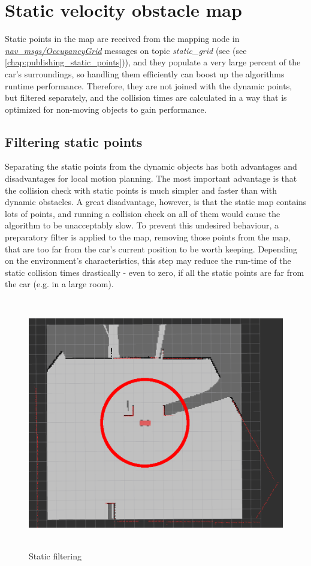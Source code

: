 \section{Static velocity obstacle map}
\label{chap:static_velocity_obstacle_map}
Static points in the map are received from the mapping node in \href{http://docs.ros.org/melodic/api/nav_msgs/html/msg/OccupancyGrid.html}{\textit{nav\_msgs/OccupancyGrid}} messages on topic \textit{static\_grid} (see (see \ref{chap:publishing_static_points})), and they populate a very large percent of the car's surroundings, so handling them efficiently can boost up the algorithms runtime performance. Therefore, they are not joined with the dynamic points, but filtered separately, and the collision times are calculated in a way that is optimized for non-moving objects to gain performance.

\subsection{Filtering static points}
Separating the static points from the dynamic objects has both advantages and disadvantages for local motion planning. The most important advantage is that the collision check with static points is much simpler and faster than with dynamic obstacles. A great disadvantage, however, is that the static map contains lots of points, and running a collision check on all of them would cause the algorithm to be unacceptably slow. To prevent this undesired behaviour, a preparatory filter is applied to the map, removing those points from the map, that are too far from the car's current position to be worth keeping. Depending on the environment's characteristics, this step may reduce the run-time of the static collision times drastically - even to zero, if all the static points are far from the car (e.g. in a large room).

\begin{figure}[!ht]
    \centering
    \includegraphics[height=110mm]{figures/raw/rviz_2_near_static_objects_filter.png}
    \caption{Static filtering}
    \label{rviz_2_near_static_objects_filter}
\end{figure}

